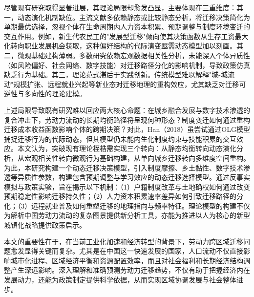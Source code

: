 \documentclass[a4paper,12pt]{article}
\begin{document}
尽管现有研究取得显著进展，其理论局限却愈发凸显，主要体现在三重维度：其一，动态演化机制缺位。主流文献多依赖静态或比较静态分析，将迁移决策简化为单期最优选择，忽视个体在生命周期内人力资本积累、预期调整与制度环境变迁的交互作用。例如，新生代农民工的"发展型迁移"倾向使其决策函数从生存工资最大化转向职业发展机会获取，这种偏好结构的代际演变亟需动态模型加以刻画。其二，微观基础建构薄弱。多数研究依赖宏观数据相关性分析，未能深入个体异质性（如风险偏好、社会网络、数字技能）对迁移路径分化的影响机制，导致政策仿真缺乏行为基础。其三，理论范式滞后于实践创新。传统模型难以解释"城-城流动"规模扩张、远程就业兴起等新业态对迁移地理的重构效应，尤其缺乏对迁移可逆性与多向性的理论建模。

上述局限导致既有研究难以回应两大核心命题：在城乡融合发展与数字技术渗透的复合冲击下，劳动力流动的长期均衡路径将呈现何种形态？制度变迁如何通过重构迁移成本收益函数影响个体的跨期决策？对此，Han（2018）虽尝试通过OLG模型捕捉迁移行为的代际动态，但其模型仍未能内生化制度约束与技能积累的交互效应。本文认为，突破现有理论桎梏需实现三个转向：从静态均衡转向动态演化分析，从宏观相关性转向微观行为基础构建，从单向城乡迁移转向多维度空间重构。为此，本研究构建一个动态迁移决策模型，引入制度摩擦、乡土黏性、数字技术渗透等异质性参数，构建包含预期调整与学习效应的动态迁移选择模型。通过反事实模拟与政策实验，旨在揭示以下机制：（1）户籍制度改革与土地确权如何通过改变预期稳定性影响迁移持久性；（2）人力资本积累速率差异如何引致迁移路径的分化；（3）远程就业普及如何重塑迁移的地理指向与频率特征。理论模型的构建不仅为解析中国劳动力流动的复杂图景提供新分析工具，亦能为推进以人为核心的新型城镇化战略提供政策启示。


本文的重要性在于，在当前工业化加速和经济转型的背景下，劳动力跨区域迁移问题愈发显得关键而复杂。尤其是在中国这一快速发展的国家，人口流动不仅直接影响城市化进程、区域经济平衡和资源配置效率，而且对社会福利和长期经济结构调整产生深远影响。深入理解和准确预测劳动力迁移趋势，不仅有助于把握经济内在发展动力，还能为政策制定提供科学依据，从而实现区域协调发展与社会整体进步。
\end{document}
